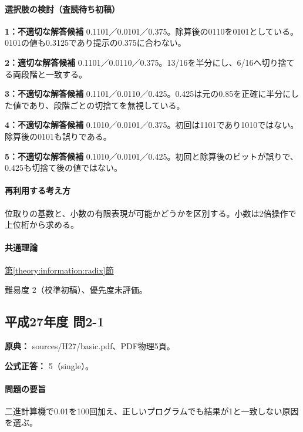 \paragraph{選択肢の検討（査読待ち初稿）}\mbox{}\par

\noindent\textbf{1：不適切な解答候補} 0.1101／0.0101／0.375。除算後の0110を0101としている。0101の値も0.3125であり提示の0.375に合わない。\par

\noindent\textbf{2：適切な解答候補} 0.1101／0.0110／0.375。13/16を半分にし、6/16へ切り捨てる両段階と一致する。\par

\noindent\textbf{3：不適切な解答候補} 0.1101／0.0110／0.425。0.425は元の0.85を正確に半分にした値であり、段階ごとの切捨てを無視している。\par

\noindent\textbf{4：不適切な解答候補} 0.1010／0.0101／0.375。初回は1101であり1010ではない。除算後の0101も誤りである。\par

\noindent\textbf{5：不適切な解答候補} 0.1010／0.0101／0.425。初回と除算後のビットが誤りで、0.425も切捨て後の値ではない。\par

\paragraph{再利用する考え方} 位取りの基数と、小数の有限表現が可能かどうかを区別する。小数は2倍操作で上位桁から求める。

\paragraph{共通理論} \hyperref[theory:information:radix]{第\ref*{theory:information:radix}節}

\par 難易度 2（校準初稿）、優先度未評価。

\subsection{平成27年度 問2-1}
\label{q:h27-reg-basic-2-1}

\noindent\textbf{原典：} sources/H27/basic.pdf、PDF物理5頁。

\textbf{公式正答：} 5（single）。

\paragraph{問題の要旨} 二進計算機で0.01を100回加え、正しいプログラムでも結果が1と一致しない原因を選ぶ。

